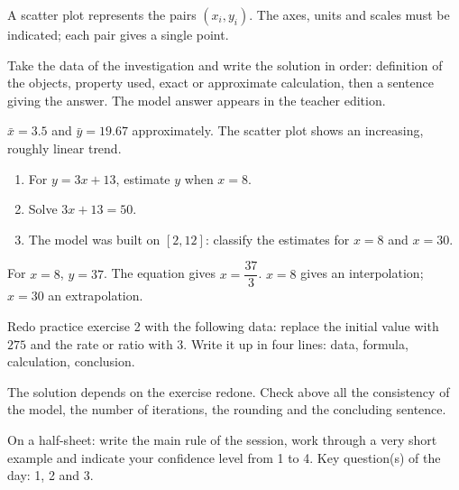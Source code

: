 \begin{summary}A scatter plot represents the pairs $(x_i,y_i)$. The axes, units and scales must be indicated; each pair gives a single point.\end{summary}

\begin{example}
Take the data of the investigation and write the solution in order: definition of the objects, property used, exact or approximate calculation, then a sentence giving the answer. The model answer appears in the teacher edition.
\end{example}
\begin{solution}$\bar x=\num{3,5}$ and $\bar y=\num{19,67}$ approximately. The scatter plot shows an increasing, roughly linear trend.\end{solution}

\begin{exercise}[essential]
\begin{enumerate}\item For $y=3x+13$, estimate $y$ when $x=8$.\item Solve $3x+13=50$.\item The model was built on $[2,12]$: classify the estimates for $x=8$ and $x=30$.\end{enumerate}
\end{exercise}
\begin{solution}For $x=8$, $y=37$. The equation gives $x=\dfrac{37}{3}$. $x=8$ gives an interpolation; $x=30$ an extrapolation.\end{solution}


\begin{homework}Redo practice exercise 2 with the following data: replace the initial value with $275$ and the rate or ratio with $3$. Write it up in four lines: data, formula, calculation, conclusion.\end{homework}
\begin{solution}The solution depends on the exercise redone. Check above all the consistency of the model, the number of iterations, the rounding and the concluding sentence.\end{solution}

\begin{exitticket}[3 minutes]On a half-sheet: write the main rule of the session, work through a very short example and indicate your confidence level from 1 to 4. Key question(s) of the day: 1, 2 and 3.\end{exitticket}

